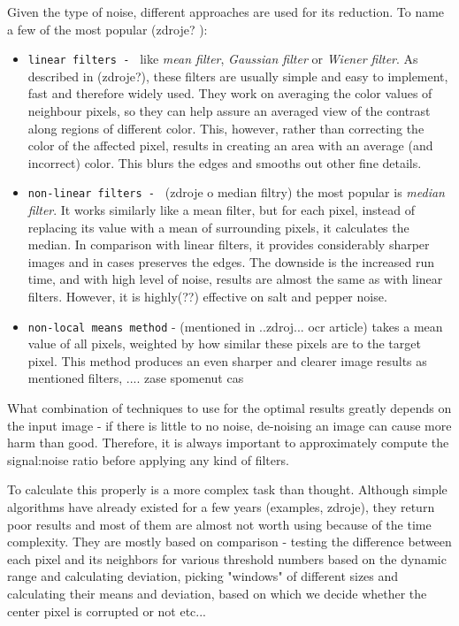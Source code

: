 Given the type of noise, different approaches are used for its reduction. To name a few of the most popular (zdroje? ):
\begin{itemize}

\item\texttt{linear filters - } like \emph{mean filter}, \emph{Gaussian filter} or \emph{Wiener filter}. As described in (zdroje?), these filters are usually simple and easy to implement, fast and therefore widely used. They work on averaging the color values of neighbour pixels, so they can help assure an averaged view of the contrast along regions of different color. This, however, rather than correcting the color of the affected pixel, results in creating an area with an average (and incorrect) color. This blurs the edges and smooths out other fine details.

\item\texttt{non-linear filters - } (zdroje o median filtry) the most popular is \emph{median filter}. It works similarly like a mean filter, but for each pixel, instead of replacing its value with a mean of surrounding pixels, it calculates the median. In comparison with linear filters, it provides considerably sharper images and in cases preserves the edges. The downside is the increased run time, and with high level of noise, results are almost the same as with linear filters. However, it is highly(??) effective on salt and pepper noise.

\item\texttt{non-local means method} - (mentioned in ..zdroj... ocr article) takes a mean value of all pixels, weighted by how similar these pixels are to the target pixel. This method produces an even sharper and clearer image results as mentioned filters, .... zase spomenut cas

\end{itemize}

What combination of techniques to use for the optimal results greatly depends on the input image - if there is little to no noise, de-noising an image can cause more harm than good. Therefore, it is always important to approximately compute the signal:noise ratio before applying any kind of filters.

To calculate this properly is a more complex task than thought. Although simple algorithms have already existed for a few years (examples, zdroje), they return poor results and most of them are almost not worth using because of the time complexity. They are mostly based on comparison - testing the difference between each pixel and its neighbors for various threshold numbers based on the dynamic range and calculating deviation, picking "windows" of different sizes and calculating their means and deviation, based on which we decide whether the center pixel is corrupted or not etc...

